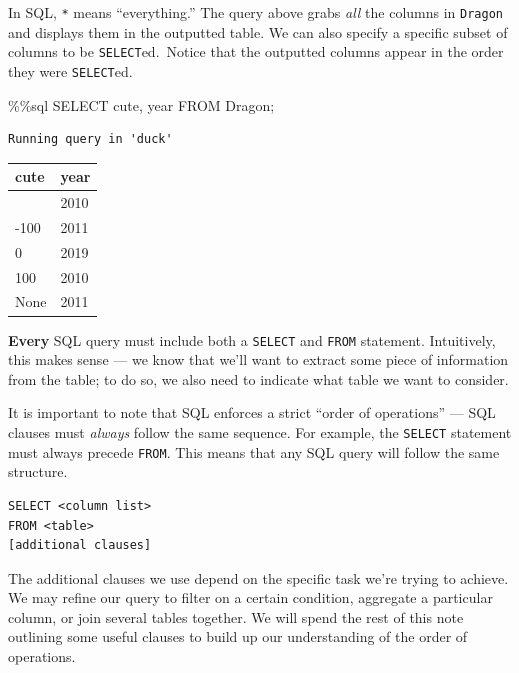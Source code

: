 \documentclass[
  letterpaper,
  DIV=11,
  numbers=noendperiod]{scrreprt}
\newenvironment{Shaded}{\begin{snugshade}}{\end{snugshade}}
\newcommand{\NormalTok}[1]{\textcolor[rgb]{0.00,0.23,0.31}{#1}}
\newcommand{\OperatorTok}[1]{\textcolor[rgb]{0.37,0.37,0.37}{#1}}
\begin{document}
In SQL, \texttt{*} means ``everything.'' The query above grabs
\emph{all} the columns in \texttt{Dragon} and displays them in the
outputted table. We can also specify a specific subset of columns to be
\texttt{SELECT}ed.~Notice that the outputted columns appear in the order
they were \texttt{SELECT}ed.

\begin{Shaded}
\begin{Highlighting}[]
\OperatorTok{\%\%}\NormalTok{sql}
\NormalTok{SELECT cute, year}
\NormalTok{FROM Dragon}\OperatorTok{;}
\end{Highlighting}
\end{Shaded}

\begin{verbatim}
Running query in 'duck'
\end{verbatim}

\begin{longtable}[]{@{}ll@{}}
\toprule\noalign{}
cute & year \\
\midrule\noalign{}
\endhead
\bottomrule\noalign{}
\endlastfoot
10 & 2010 \\
-100 & 2011 \\
0 & 2019 \\
100 & 2010 \\
None & 2011 \\
\end{longtable}

\textbf{Every} SQL query must include both a \texttt{SELECT} and
\texttt{FROM} statement. Intuitively, this makes sense --- we know that
we'll want to extract some piece of information from the table; to do
so, we also need to indicate what table we want to consider.

It is important to note that SQL enforces a strict ``order of
operations'' --- SQL clauses must \emph{always} follow the same
sequence. For example, the \texttt{SELECT} statement must always precede
\texttt{FROM}. This means that any SQL query will follow the same
structure.

\begin{verbatim}
SELECT <column list>
FROM <table>
[additional clauses]
\end{verbatim}

The additional clauses we use depend on the specific task we're trying
to achieve. We may refine our query to filter on a certain condition,
aggregate a particular column, or join several tables together. We will
spend the rest of this note outlining some useful clauses to build up
our understanding of the order of operations.
\end{document}
